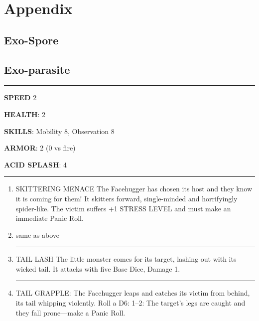 \chapter{Appendix}


\section{Exo-Spore}


\section{Exo-parasite}


\begin{rpg-commentbox}{}


    \par\noindent\rule{\textwidth}{0.4pt}

    \textbf{SPEED} 2

    \textbf{HEALTH}: 2

    \textbf{SKILLS}: Mobility 8, Observation 8
    
    \textbf{ARMOR}: 2 (0 vs fire)
    
    \textbf{ACID SPLASH}: 4

    \par\noindent\rule{\textwidth}{0.4pt}


    \begin{enumerate}
        \item SKITTERING MENACE The Facehugger has chosen its host and they know it is coming for
        them! It skitters forward, single-minded and horrifyingly spider-like. The victim suffers +1
        STRESS LEVEL and must make an immediate Panic Roll.
        \item same as above
        
        \par\noindent\rule{.9\textwidth}{0.4pt}

        \item TAIL LASH The little monster comes for its target, lashing out with its wicked tail. It attacks
        with five Base Dice, Damage 1.

        \par\noindent\rule{.9\textwidth}{0.4pt}

        \item TAIL GRAPPLE: The Facehugger leaps and catches its victim from behind, its tail whipping
        violently. Roll a D6:
            1–2: The target’s legs are caught and they fall prone—make a Panic Roll.
            

\end{enumerate}
\end{rpg-commentbox}
